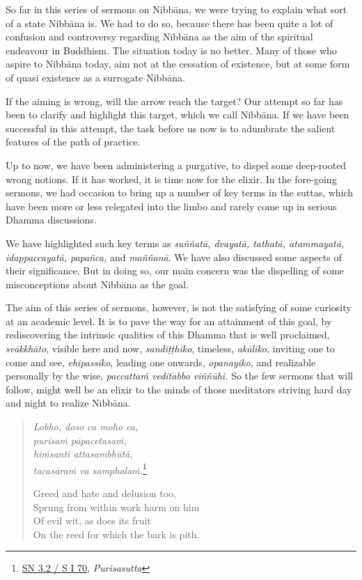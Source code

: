 So far in this series of sermons on Nibbāna, we were trying to explain what sort of a state Nibbāna is. We had to do so, because there has been quite a lot of confusion and controversy regarding Nibbāna as the aim of the spiritual endeavour in Buddhism. The situation today is no better. Many of those who aspire to Nibbāna today, aim not at the cessation of existence, but at some form of quasi existence as a surrogate Nibbāna.

If the aiming is wrong, will the arrow reach the target? Our attempt so far has been to clarify and highlight this target, which we call Nibbāna. If we have been successful in this attempt, the task before us now is to adumbrate the salient features of the path of practice.

Up to now, we have been administering a purgative, to dispel some deep-rooted wrong notions. If it has worked, it is time now for the elixir. In the fore-going sermons, we had occasion to bring up a number of key terms in the suttas, which have been more or less relegated into the limbo and rarely come up in serious Dhamma discussions.

We have highlighted such key terms as \emph{suññatā, dvayatā, tathatā, atammayatā, idappaccayatā, papañca,} and \emph{maññanā}. We have also discussed some aspects of their significance. But in doing so, our main concern was the dispelling of some misconceptions about Nibbāna as the goal.

The aim of this series of sermons, however, is not the satisfying of some curiosity at an academic level. It is to pave the way for an attainment of this goal, by rediscovering the intrinsic qualities of this Dhamma that is well proclaimed, \emph{svākkhāto}, visible here and now, \emph{sandiṭṭhiko}, timeless, \emph{akāliko}, inviting one to come and see, \emph{ehipassiko}, leading one onwards, \emph{opanayiko}, and realizable personally by the wise, \emph{paccattaṁ veditabbo viññūhi.} So the few sermons that will follow, might well be an elixir to the minds of those meditators striving hard day and night to realize Nibbāna.

\begin{quote}
\emph{Lobho, doso ca moho ca,}\\
\emph{purisaṁ pāpacetasaṁ,}\\
\emph{hiṁsanti attasambhūtā,}\\
\emph{tacasāraṁ va samphalaṁ.}\footnote{\href{https://suttacentral.net/sn3.2/pli/ms}{SN 3.2 / S I 70}, \emph{Purisasutta}}

Greed and hate and delusion too,\\
Sprung from within work harm on him\\
Of evil wit, as does its fruit\\
On the reed for which the bark is pith.
\end{quote}

